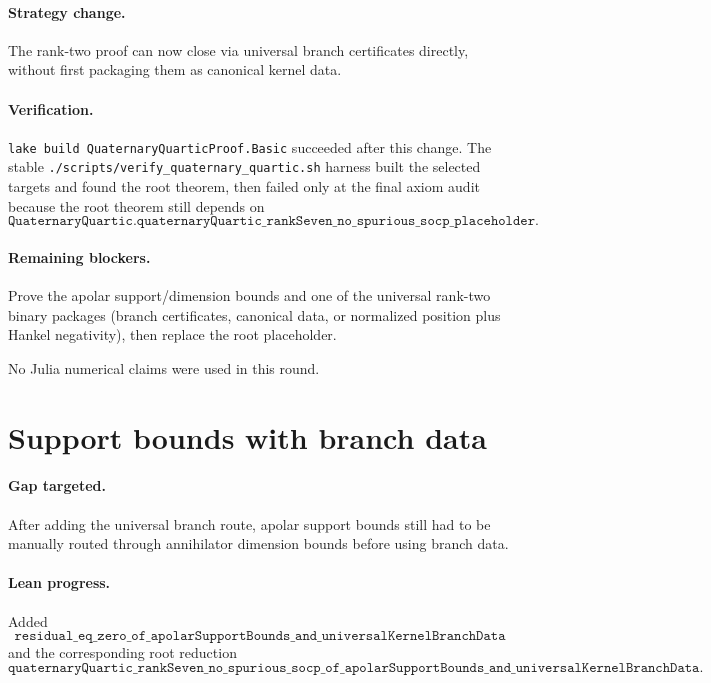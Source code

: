 \documentclass[11pt]{article}
\begin{document}
\paragraph{Strategy change.}
The rank-two proof can now close via universal branch certificates directly,
without first packaging them as canonical kernel data.

\paragraph{Verification.}
\texttt{lake build QuaternaryQuarticProof.Basic} succeeded after this change.
The stable \texttt{./scripts/verify\_quaternary\_quartic.sh} harness built the
selected targets and found the root theorem, then failed only at the final axiom
audit because the root theorem still depends on
\[
\texttt{QuaternaryQuartic.quaternaryQuartic\_rankSeven\_no\_spurious\_socp\_placeholder}.
\]

\paragraph{Remaining blockers.}
Prove the apolar support/dimension bounds and one of the universal rank-two
binary packages (branch certificates, canonical data, or normalized
position plus Hankel negativity), then replace the root placeholder.

No Julia numerical claims were used in this round.

\section*{Support bounds with branch data}

\paragraph{Gap targeted.}
After adding the universal branch route, apolar support bounds still had to be
manually routed through annihilator dimension bounds before using branch data.

\paragraph{Lean progress.}
Added
\[
\texttt{residual\_eq\_zero\_of\_apolarSupportBounds\_and\_universalKernelBranchData}
\]
and the corresponding root reduction
\[
\texttt{quaternaryQuartic\_rankSeven\_no\_spurious\_socp\_of\_apolarSupportBounds\_and\_universalKernelBranchData}.
\]
\end{document}
